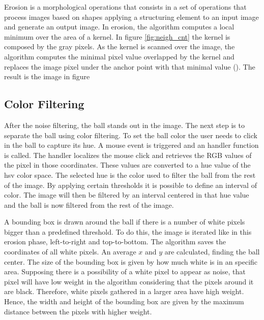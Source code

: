 Erosion is a morphological operations that consists in a set of operations that process images based on shapes applying a structuring element to an input image and generate an output image. In erosion, the algorithm computes a local minimum over the area of a kernel. In figure \ref{fig:neigh_cnt} the kernel is composed by the gray pixels. As the kernel is scanned over the image, the algorithm computes the minimal pixel value overlapped by the kernel and replaces the image pixel under the anchor point with that minimal value (\cite{OpenCV2.4.13.6documentation}). The result is the image in figure 

\subsection{Color Filtering}

After the noise filtering, the ball stands out in the image. The next step is to separate the ball using color filtering. To set the ball color the user needs to click in the ball to capture its hue. A mouse event is triggered and an handler function is called. The handler localizes the mouse click and retrieves the RGB values of the pixel in those coordinates. These values are converted to a hue value of the \gls{hsv} color space. The selected hue is the color used to filter the ball from the rest of the image. By applying certain thresholds it is possible to define an interval of color. The image will then be filtered by an interval centered in that hue value and the ball is now filtered from the rest of the image. 

A bounding box is drawn around the ball if there is a number of white pixels bigger than a predefined threshold. To do this, the image is iterated like in this erosion phase, left-to-right and top-to-bottom. The algorithm saves the coordinates of all white pixels. An average $x$ and $y$ are calculated, finding the ball center. The size of the bounding box is given by how much white is in an specific area. Supposing there is a possibility of a white pixel to appear as noise, that pixel will have low weight in the algorithm considering that the pixels around it are black. Therefore, white pixels gathered in a larger area have high weight. Hence, the width and height of the bounding box are given by the maximum distance between the pixels with higher weight.


